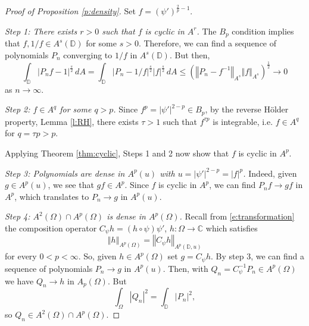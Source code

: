 \documentclass{amsart}
\newcommand{\norm}[1]{\left\Vert {#1}\right\Vert}
\theoremstyle{definition}
\numberwithin{equation}{section}
\begin{document}
\begin{proof}[Proof of Proposition \ref{p:density}]
    Set $f=(\psi')^{\frac{2}{p}-1}$. 
    
    \textit{Step 1: There exists $r>0$ such that $f$ is cyclic in $A^r$.}
The $B_p$ condition implies that $f,1/f \in A^s(\mathbb D)$ for some $s>0$. Therefore, we can find a sequence of polynomials $P_n$ converging to $1/f$ in $A^s(\mathbb D)$. But then,
    \[ \int_{\mathbb D} |P_n f -1 |^{\frac s2}\, dA = \int_{\mathbb D} |P_n - 1/f|^{\frac s2} |f|^{\frac s2} \, dA \le \left( \norm{P_n-f^{-1}}_{A^s} \norm{f}_{A^s}\right)^{\frac 12} \to 0\]
as $n \to \infty$.

    \textit{Step 2: $f \in A^q$ for some $q>p$.} Since $f^p = |\psi'|^{2-p} \in B_p$, by the reverse H\"older property, Lemma \ref{l:RH}, there exists $\tau>1$ such that $f^{\tau p}$ is integrable, i.e. $f \in A^q$ for $q=\tau p > p$.
    
    Applying Theorem \ref{thm:cyclic}, Steps 1 and 2 now show that $f$ is cyclic in $A^p$. 
    
    \textit{Step 3: Polynomials are dense in $A^p(u)$ with $u=|\psi'|^{2-p} = |f|^p$.} Indeed, given $g \in A^p(u)$, we see that $gf \in A^p$. Since $f$ is cyclic in $A^p$, we can find $P_nf \to gf$ in $A^p$, which translates to $P_n \to g$ in $A^p(u)$.
    
    \textit{Step 4: $A^2(\Omega) \cap A^p(\Omega)$ is dense in $A^p(\Omega)$.} Recall from \eqref{e:transformation} the composition operator $C_\psi h = (h \circ \psi ) \psi'$, $h:\Omega \to \mathbb C$ which satisfies
        \[ \norm{h}_{A^p(\Omega)} = \norm{C_\psi h}_{A^p(\mathbb D,u)}\]
    for every $0<p<\infty$. So, given $h \in A^p(\Omega)$ set $g=C_\psi h$. By step 3, we can find a sequence of polynomials $P_n \to g$ in $A^p(u)$. Then, with $Q_n = C_\psi^{-1}P_n \in A^p(\Omega)$ we have $Q_n \to h$ in $A_p(\Omega)$. But 
        \[ \int_{\Omega} |Q_n|^2 = \int_{\mathbb D} |P_n|^2,\]
    so $Q_n \in A^2(\Omega) \cap A^p(\Omega)$. 
\end{proof}
\end{document}
